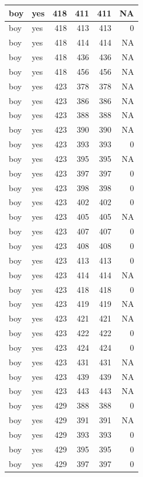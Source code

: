 \documentclass[man]{apa6}
\begin{document}
\begin{tabular}{l|l|r|r|r|r}
\hline
boy & yes & 418 & 411 & 411 & NA\\
\hline
boy & yes & 418 & 413 & 413 & 0\\
\hline
boy & yes & 418 & 414 & 414 & NA\\
\hline
boy & yes & 418 & 436 & 436 & NA\\
\hline
boy & yes & 418 & 456 & 456 & NA\\
\hline
boy & yes & 423 & 378 & 378 & NA\\
\hline
boy & yes & 423 & 386 & 386 & NA\\
\hline
boy & yes & 423 & 388 & 388 & NA\\
\hline
boy & yes & 423 & 390 & 390 & NA\\
\hline
boy & yes & 423 & 393 & 393 & 0\\
\hline
boy & yes & 423 & 395 & 395 & NA\\
\hline
boy & yes & 423 & 397 & 397 & 0\\
\hline
boy & yes & 423 & 398 & 398 & 0\\
\hline
boy & yes & 423 & 402 & 402 & 0\\
\hline
boy & yes & 423 & 405 & 405 & NA\\
\hline
boy & yes & 423 & 407 & 407 & 0\\
\hline
boy & yes & 423 & 408 & 408 & 0\\
\hline
boy & yes & 423 & 413 & 413 & 0\\
\hline
boy & yes & 423 & 414 & 414 & NA\\
\hline
boy & yes & 423 & 418 & 418 & 0\\
\hline
boy & yes & 423 & 419 & 419 & NA\\
\hline
boy & yes & 423 & 421 & 421 & NA\\
\hline
boy & yes & 423 & 422 & 422 & 0\\
\hline
boy & yes & 423 & 424 & 424 & 0\\
\hline
boy & yes & 423 & 431 & 431 & NA\\
\hline
boy & yes & 423 & 439 & 439 & NA\\
\hline
boy & yes & 423 & 443 & 443 & NA\\
\hline
boy & yes & 429 & 388 & 388 & 0\\
\hline
boy & yes & 429 & 391 & 391 & NA\\
\hline
boy & yes & 429 & 393 & 393 & 0\\
\hline
boy & yes & 429 & 395 & 395 & 0\\
\hline
boy & yes & 429 & 397 & 397 & 0\\

\end{tabular}
\end{document}
